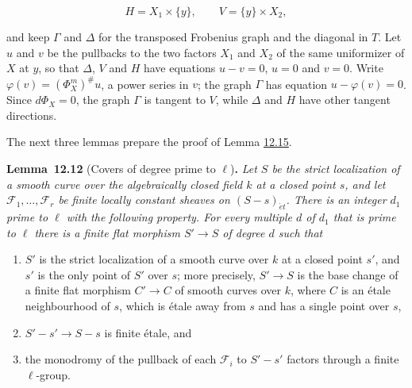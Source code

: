 \documentclass[11pt]{article}
\newenvironment{bpstatement}[2]{\par\addvspace{0.6\baselineskip}\noindent\textbf{#1}#2\textbf{.}\enspace\ignorespaces}
  {\par\addvspace{0.4\baselineskip}}
\newenvironment{bpstatementit}[2]{\begin{bpstatement}{#1}{#2}\itshape\ignorespaces}{\end{bpstatement}}
\begin{document}
\[
H=X_1\times\{y\},\qquad V=\{y\}\times X_2,
\]

and keep \(\Gamma\) and \(\Delta\) for the transposed Frobenius graph and the diagonal in \(T\). Let \(u\) and \(v\) be the pullbacks to the two factors \(X_1\) and \(X_2\) of the same uniformizer of \(X\) at \(y\), so that \(\Delta\), \(V\) and \(H\) have equations \(u-v=0\), \(u=0\) and \(v=0\). Write \(\varphi(v)=(\Phi_X^m)^\#u\), a power series in \(v\); the graph \(\Gamma\) has equation \(u-\varphi(v)=0\). Since \(d\Phi_X=0\), the graph \(\Gamma\) is tangent to \(V\), while \(\Delta\) and \(H\) have other tangent directions.

The next three lemmas prepare the proof of Lemma \hyperref[bp45]{12.15}.

\label{bp38}%
\begin{bpstatementit}{Lemma~12.12}{ (Covers of degree prime to $\ell$)}
Let \(S\) be the strict localization of a smooth curve over the algebraically closed field \(k\) at a closed point \(s\), and let \(\mathcal F_1,\dots,\mathcal F_r\) be finite locally constant sheaves on \((S-s)_{\acute{e}t}\). There is an integer \(d_1\) prime to \(\ell\) with the following property. For every multiple \(d\) of \(d_1\) that is prime to \(\ell\) there is a finite flat morphism \(S'\to S\) of degree \(d\) such that

\begin{enumerate}
\item \(S'\) is the strict localization of a smooth curve over \(k\) at a closed point \(s'\), and \(s'\) is the only point of \(S'\) over \(s\); more precisely, \(S'\to S\) is the base change of a finite flat morphism \(C'\to C\) of smooth curves over \(k\), where \(C\) is an étale neighbourhood of \(s\), which is étale away from \(s\) and has a single point over \(s\),
\item \(S'-s'\to S-s\) is finite étale, and
\item the monodromy of the pullback of each \(\mathcal F_i\) to \(S'-s'\) factors through a finite \(\ell\)-group.
\end{enumerate}
\end{bpstatementit}
\end{document}
